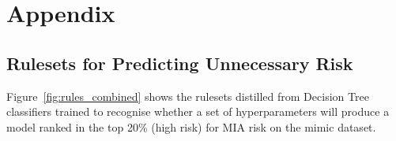 \appendix
\section{Appendix}

\subsection{Rulesets for Predicting Unnecessary Risk}%
\label{sec:rules}

Figure~\ref{fig:rules_combined} shows the rulesets distilled from Decision Tree classifiers trained to recognise whether a set of hyperparameters will produce a model ranked in the top 20\% (high risk) for MIA risk on the mimic dataset.


